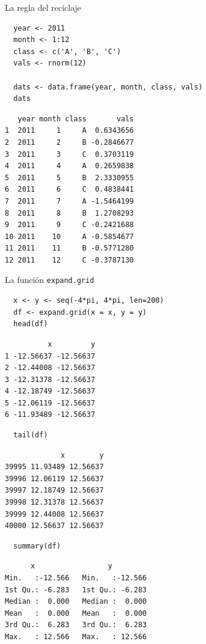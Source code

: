 \documentclass[xcolor={usenames,svgnames,dvipsnames}]{beamer}
\begin{document}
\begin{frame}[fragile,label=sec-3-2-3]{La regla del reciclaje}
 \lstset{language=R,label= ,caption= ,numbers=none}
\begin{lstlisting}
  year <- 2011
  month <- 1:12
  class <- c('A', 'B', 'C')
  vals <- rnorm(12)
  
  dats <- data.frame(year, month, class, vals)
  dats
\end{lstlisting}

\begin{verbatim}
   year month class       vals
1  2011     1     A  0.6343656
2  2011     2     B -0.2846677
3  2011     3     C  0.3703119
4  2011     4     A  0.2659838
5  2011     5     B  2.3330955
6  2011     6     C  0.4838441
7  2011     7     A -1.5464199
8  2011     8     B  1.2708293
9  2011     9     C -0.2421688
10 2011    10     A -0.5854677
11 2011    11     B -0.5771280
12 2011    12     C -0.3787130
\end{verbatim}
\end{frame}

\begin{frame}[fragile,label=sec-3-2-4]{La función \texttt{expand.grid}}
 \lstset{language=R,label= ,caption= ,numbers=none}
\begin{lstlisting}
  x <- y <- seq(-4*pi, 4*pi, len=200)
  df <- expand.grid(x = x, y = y)
  head(df)
\end{lstlisting}

\begin{verbatim}
          x         y
1 -12.56637 -12.56637
2 -12.44008 -12.56637
3 -12.31378 -12.56637
4 -12.18749 -12.56637
5 -12.06119 -12.56637
6 -11.93489 -12.56637
\end{verbatim}

\lstset{language=R,label= ,caption= ,numbers=none}
\begin{lstlisting}
  tail(df)
\end{lstlisting}

\begin{verbatim}
             x        y
39995 11.93489 12.56637
39996 12.06119 12.56637
39997 12.18749 12.56637
39998 12.31378 12.56637
39999 12.44008 12.56637
40000 12.56637 12.56637
\end{verbatim}

\lstset{language=R,label= ,caption= ,numbers=none}
\begin{lstlisting}
  summary(df)
\end{lstlisting}

\begin{verbatim}
      x                 y          
Min.   :-12.566   Min.   :-12.566  
1st Qu.: -6.283   1st Qu.: -6.283  
Median :  0.000   Median :  0.000  
Mean   :  0.000   Mean   :  0.000  
3rd Qu.:  6.283   3rd Qu.:  6.283  
Max.   : 12.566   Max.   : 12.566
\end{verbatim}
\end{frame}
\end{document}
